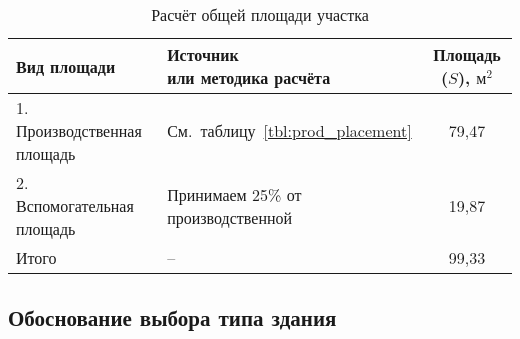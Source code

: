 \begin{table} [h!]
  \caption{
    Расчёт общей площади участка
  }\label{tbl:common_placement}
    \begin{tabular}{| m{5.8cm} | m{5.75cm} | c |}
      \hline
      \parbox{5.8cm}{
        \smallskip
        \centering Вид  площади
        \smallskip
      }
      & \parbox{5.75cm}{
          \smallskip
          \centering Источник \\ или методика расчёта
          \smallskip
      }
      & Площадь (\( S \)), \( \text{м}^2 \) \\
      \hline

      1. Производственная \newline площадь
      & \centering См.~таблицу~\ref{tbl:prod_placement}
      & 79,47 \\
      \hline

      2. Вспомогательная \newline площадь
      & \centering Принимаем 25\% \newline от производственной
      & 19,87 \\
      \hline


      Итого & \centering -- & 99,33 \\
      \hline
    \end{tabular}
\end{table}

\subsection{Обоснование выбора типа здания}


